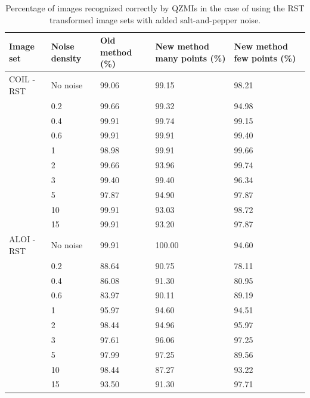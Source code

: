 \begin{table}
    \centering
    \begin{tabular}{|p{2.15cm}|p{1.8cm}|p{3cm}|p{2.74cm}|p{2.6cm}|} \hline
        \textbf{Image set} & \textbf{Noise density} & \textbf{Old method} (\%) & \textbf{New method} many points (\%)& \textbf{New method} few points (\%) \\ \hline\hline
        COIL - RST & No noise & 99.06 & 99.15 & 98.21 \\ \cline{2-5}
        & 0.2 & 99.66 & 99.32 & 94.98 \\ \cline{2-5}
        & 0.4 & 99.91 & 99.74 & 99.15 \\ \cline{2-5}
        & 0.6 & 99.91 & 99.91 & 99.40 \\ \cline{2-5}
        & 1 & 98.98 & 99.91 & 99.66 \\ \cline{2-5}
        & 2 & 99.66 & 93.96 & 99.74 \\ \cline{2-5}
        & 3 & 99.40 & 99.40 & 96.34 \\ \cline{2-5}
        & 5 & 97.87 & 94.90 & 97.87 \\ \cline{2-5}
        & 10 & 99.91 & 93.03 & 98.72 \\ \cline{2-5}
        & 15 & 99.91 & 93.20 & 97.87 \\ \hline\hline
        ALOI - RST & No noise & 99.91 & 100.00 & 94.60 \\ \cline{2-5}
        & 0.2 & 88.64 & 90.75 & 78.11 \\ \cline{2-5}
        & 0.4 & 86.08 & 91.30 & 80.95 \\ \cline{2-5}
        & 0.6 & 83.97 & 90.11 & 89.19 \\ \cline{2-5}
        & 1 & 95.97 & 94.60 & 94.51 \\ \cline{2-5}
        & 2 & 98.44 & 94.96 & 95.97 \\ \cline{2-5}
        & 3 & 97.61 & 96.06 & 97.25 \\ \cline{2-5}
        & 5 & 97.99 & 97.25 & 89.56 \\ \cline{2-5}
        & 10 & 98.44 & 87.27 & 93.22 \\ \cline{2-5}
        & 15 & 93.50 & 91.30 & 97.71 \\ \cline{1-5}
    \end{tabular}
    \caption{Percentage of images recognized correctly by QZMIs in the case of using the RST transformed image sets with added salt-and-pepper noise.}
    \label{tab:recognition_salt}
\end{table}

